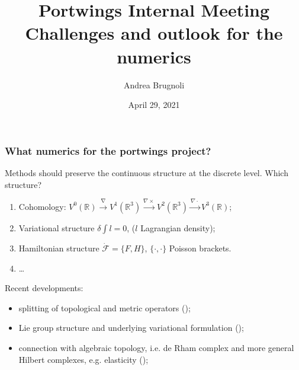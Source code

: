 \documentclass{beamer}
\title{Portwings Internal Meeting\\
Challenges and outlook for the numerics}
\author[A.~Brugnoli]{Andrea Brugnoli} %
\institute[UT]{Department of Robotics and Mechatronics,\\ University of Twente}
\date[29-04-2021]{April 29, 2021}
\newcommand{\bbR}{\mathbb{R}}
\begin{document}
\maketitle


\begin{frame}\frametitle{What numerics for the portwings project?}
Methods should preserve the continuous structure at the discrete level. Which structure? 
\begin{enumerate}
	\item Cohomology: $V^0(\bbR) \xrightarrow{\nabla} V^1(\bbR^3) \xrightarrow{\nabla \times} V^2(\bbR^3) \xrightarrow{\nabla \cdot} V^3(\bbR)$;
	\item Variational structure $\delta \int l = 0$, ($l$ Lagrangian density);
	\item Hamiltonian structure $\dot{\mathcal{F}} = \{F, H\}$, $\{\cdot, \cdot\}$ Poisson brackets.
	\item \dots
\end{enumerate}
\vspace{.1cm}
Recent developments:
\begin{itemize}
\item splitting of topological and metric operators (\cite{bauer2018split});
\item Lie group structure and underlying variational formulation (\cite{gawlik2020variational});
\item connection with algebraic topology, i.e. de Rham complex and more general Hilbert complexes, e.g. elasticity (\cite{bochev2006mimetic,arnold2006acta,palha2014compatible}); 
\end{itemize}

\end{frame}
\end{document}
